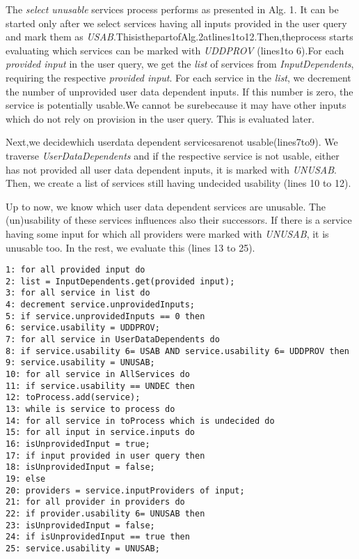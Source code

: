 \documentclass{llncs}
\begin{document}
The \textit{ select unusable }services process performs as presented in Alg. 1. It can be 
started only after we select services having all inputs provided in the user query and 
mark them as\textit{ USAB}.ThisisthepartofAlg.2atlines1to12.Then,theprocess starts 
evaluating which services can be marked with\textit{ UDDPROV} (lines1to 6).For each 
\textit{provided input} in the user query, we get the\textit{ list} of services from\textit{ InputDependents}, 
requiring the respective \textit{provided input}. For each service in the \textit{list}, we decrement 
the number of unprovided user data dependent inputs. If this number is zero, the 
service is potentially usable.We cannot be surebecause it may have other inputs 
which do not rely on provision in the user query. This is evaluated later. 

Next,we decidewhich userdata dependent servicesarenot usable(lines7to9). 
We traverse \textit{UserDataDependents} and if the respective service is not usable, either 
has not provided all user data dependent inputs, it is marked with\textit{ UNUSAB}. Then, 
we create a list of services still having undecided usability (lines 10 to 12). 

Up to now, we know which user data dependent services are unusable. The 
(un)usability of these services influences also their successors. If there is a service 
having some input for which all providers were marked with\textit{ UNUSAB}, it is 
unusable too. In the rest, we evaluate this (lines 13 to 25). 

\begin{verbatim}
1: for all provided input do
2: list = InputDependents.get(provided input);
3: for all service in list do
4: decrement service.unprovidedInputs;
5: if service.unprovidedInputs == 0 then
6: service.usability = UDDPROV;
7: for all service in UserDataDependents do
8: if service.usability 6= USAB AND service.usability 6= UDDPROV then
9: service.usability = UNUSAB;
10: for all service in AllServices do
11: if service.usability == UNDEC then
12: toProcess.add(service);
13: while is service to process do
14: for all service in toProcess which is undecided do
15: for all input in service.inputs do
16: isUnprovidedInput = true;
17: if input provided in user query then
18: isUnprovidedInput = false;
19: else
20: providers = service.inputProviders of input;
21: for all provider in providers do
22: if provider.usability 6= UNUSAB then
23: isUnprovidedInput = false;
24: if isUnprovidedInput == true then
25: service.usability = UNUSAB;
\end{verbatim}
\end{document}
